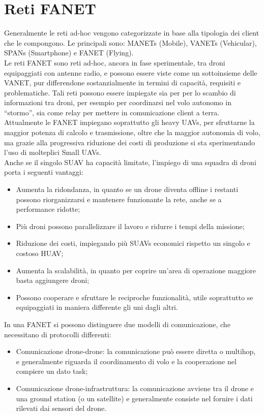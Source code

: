 \section[Reti FANET]{Reti FANET}
Generalmente le reti ad-hoc vengono categorizzate in base alla tipologia dei client che le compongono. Le principali sono: MANETs (Mobile), VANETs (Vehicular), SPANs (Smartphone) e FANET (Flying). \\
Le reti FANET sono reti ad-hoc, ancora in fase sperimentale, tra droni equipaggiati con antenne radio, e possono essere viste come un sottoinsieme delle VANET, pur differendone sostanzialmente in termini di capacità, requisiti e problematiche. 
Tali reti possono essere impiegate sia per per lo scambio di informazioni tra droni, per esempio per coordinarsi nel volo autonomo in “stormo”, sia come relay per mettere in comunicazione client a terra. \\
Attualmente le FANET impiegano soprattutto gli heavy UAVs, per sfruttarne la maggior potenza di calcolo e trasmissione, oltre che la maggior autonomia di volo, ma grazie alla progressiva riduzione dei costi di produzione si sta sperimentando l'uso di molteplici Small UAVs. \\
Anche se il singolo SUAV ha capacità limitate, l'impiego di una squadra di droni  porta i seguenti vantaggi:
\begin{itemize}
	\item Aumenta la ridondanza, in quanto se un drone diventa offline i restanti possono riorganizzarsi e mantenere funzionante la rete, anche se a performance ridotte;
	\item Più droni possono parallelizzare il lavoro e ridurre i tempi della missione;
	\item Riduzione dei costi, impiegando più SUAVs economici rispetto un singolo e costoso HUAV;
	\item Aumenta la scalabilità, in quanto per coprire un'area di operazione maggiore basta aggiungere droni;
	\item Possono cooperare e sfruttare le reciproche funzionalità, utile soprattutto se equipaggiati in maniera differente gli uni dagli altri.
\end{itemize}

In una FANET si possono distinguere due modelli di comunicazione, che necessitano di protocolli differenti:
\begin{itemize}
	\item Comunicazione drone-drone: la comunicazione può essere diretta o multihop, e generalmente riguarda il coordinamento di volo e la cooperazione nel compiere un dato task;
	\item Comunicazione drone-infrastruttura: la comunicazione avviene tra il drone e una ground station (o un satellite) e generalmente consiste nel fornire i dati rilevati dai sensori del drone.
\end{itemize}

